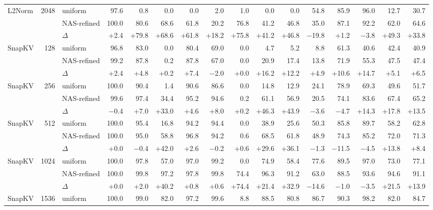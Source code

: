 \begin{table}[tp]
\begin{tabular}{@{}l r l r r r r r r r r r r r r r @{}}
    \midrule
    L2Norm & 2048 & uniform & 97.6 & 0.8 & 0.0 & 0.0 & 2.0 & 1.0 & 0.0 & 0.0 & 54.8 & 85.9 & 96.0 & 12.7 & 30.7 \\
     &  & NAS-refined & 100.0 & 80.6 & 68.6 & 61.8 & 20.2 & 76.8 & 41.2 & 46.8 & 35.0 & 87.1 & 92.2 & 62.0 & 64.6 \\
     &  & $\Delta$ & +2.4 & +79.8 & +68.6 & +61.8 & +18.2 & +75.8 & +41.2 & +46.8 & $-$19.8 & +1.2 & $-$3.8 & +49.3 & +33.8 \\
    \midrule
    SnapKV & 128 & uniform & 96.8 & 83.0 & 0.0 & 80.4 & 69.0 & 0.0 & 4.7 & 5.2 & 8.8 & 61.3 & 40.6 & 42.4 & 40.9 \\
     &  & NAS-refined & 99.2 & 87.8 & 0.2 & 87.8 & 67.0 & 0.0 & 20.9 & 17.4 & 13.8 & 71.9 & 55.3 & 47.5 & 47.4 \\
     &  & $\Delta$ & +2.4 & +4.8 & +0.2 & +7.4 & $-$2.0 & +0.0 & +16.2 & +12.2 & +4.9 & +10.6 & +14.7 & +5.1 & +6.5 \\
    \midrule
    SnapKV & 256 & uniform & 100.0 & 90.4 & 1.4 & 90.6 & 86.6 & 0.0 & 14.8 & 12.9 & 24.1 & 78.9 & 69.3 & 49.6 & 51.7 \\
     &  & NAS-refined & 99.6 & 97.4 & 34.4 & 95.2 & 94.6 & 0.2 & 61.1 & 56.9 & 20.5 & 74.1 & 83.6 & 67.4 & 65.2 \\
     &  & $\Delta$ & $-$0.4 & +7.0 & +33.0 & +4.6 & +8.0 & +0.2 & +46.3 & +43.9 & $-$3.6 & $-$4.7 & +14.3 & +17.8 & +13.5 \\
    \midrule
    SnapKV & 512 & uniform & 100.0 & 95.4 & 16.8 & 94.2 & 94.4 & 0.0 & 38.9 & 25.6 & 50.3 & 85.8 & 89.7 & 58.2 & 62.8 \\
     &  & NAS-refined & 100.0 & 95.0 & 58.8 & 96.8 & 94.2 & 0.6 & 68.5 & 61.8 & 48.9 & 74.3 & 85.2 & 72.0 & 71.3 \\
     &  & $\Delta$ & +0.0 & $-$0.4 & +42.0 & +2.6 & $-$0.2 & +0.6 & +29.6 & +36.1 & $-$1.3 & $-$11.5 & $-$4.5 & +13.8 & +8.4 \\
    \midrule
    SnapKV & 1024 & uniform & 100.0 & 97.8 & 57.0 & 97.0 & 99.2 & 0.0 & 74.9 & 58.4 & 77.6 & 89.5 & 97.0 & 73.0 & 77.1 \\
     &  & NAS-refined & 100.0 & 99.8 & 97.2 & 97.8 & 99.8 & 74.4 & 96.3 & 91.2 & 63.0 & 88.5 & 93.6 & 94.6 & 91.1 \\
     &  & $\Delta$ & +0.0 & +2.0 & +40.2 & +0.8 & +0.6 & +74.4 & +21.4 & +32.9 & $-$14.6 & $-$1.0 & $-$3.5 & +21.5 & +13.9 \\
    \midrule
    SnapKV & 1536 & uniform & 100.0 & 99.0 & 82.0 & 97.2 & 99.6 & 8.8 & 88.5 & 80.8 & 86.7 & 90.3 & 98.2 & 82.0 & 84.7 \\

\end{tabular}
\end{table}
